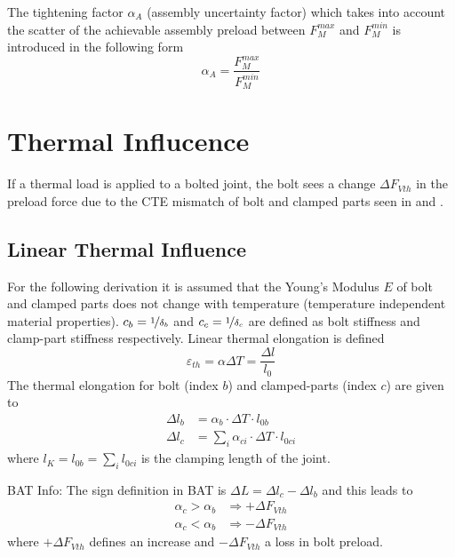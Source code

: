 The tightening factor $\alpha_A$ (assembly uncertainty factor) which takes into account the scatter 
of the achievable assembly preload between $F_M^{max}$ and $F_M^{min}$ is introduced in the following form 
\begin{equation}
  \alpha_A = \frac{F_M^{max}}{F_M^{min}}
\end{equation}

\section{Thermal Influcence}
\label{sec:thermal}
If a thermal load is applied to a bolted joint, the bolt sees a change $\Delta F_{Vth}$ in the preload
force due to the CTE mismatch of bolt and clamped parts seen in  and .
\subsection{Linear Thermal Influence}
For the following derivation it is assumed that the Young's Modulus $E$ of bolt and clamped parts does 
not change with temperature (temperature independent material properties). $c_b=\nicefrac{1}{\delta_b}$
and $c_c=\nicefrac{1}{\delta_c}$ are defined as bolt stiffness and clamp-part stiffness respectively.
Linear thermal elongation is defined
\begin{equation*}
  \varepsilon_{th} = \alpha \Delta T = \frac{\Delta l}{l_0}
\end{equation*}
The thermal elongation for bolt (index $b$) and clamped-parts (index $c$) are given to
\begin{subequations}
  \begin{align*}
    \Delta l_b &= \alpha_b \cdot \Delta T \cdot l_{0b} \\
    \Delta l_c &= \sum_i \alpha_{ci} \cdot \Delta T \cdot l_{0ci}
  \end{align*}
\end{subequations}
where $l_K = l_{0b} = \sum_i l_{0ci}$ is the clamping length of the joint.
\begin{colbox}{BAT Info:}
  The sign definition in BAT is $\Delta L = \Delta l_c - \Delta l_b$ and this leads to 
  \begin{subequations}
    \begin{align*}
      \alpha_c > \alpha_b &\Rightarrow \pmb{+}\Delta F_{Vth} \\
      \alpha_c < \alpha_b &\Rightarrow \pmb{-}\Delta F_{Vth}
    \end{align*}
  \end{subequations}
  where $\pmb{+}\Delta F_{Vth}$ defines an increase and $\pmb{-}\Delta F_{Vth}$ a loss in bolt preload.
\end{colbox}
